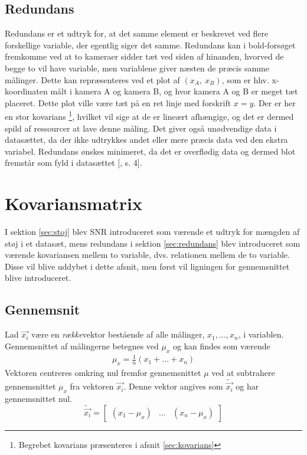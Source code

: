 \subsection{Redundans} \label{sec:redundans}
Redundans er et udtryk for, at det samme element er beskrevet ved flere forskellige variable, der egentlig siger det samme. Redundans kan i bold-forsøget fremkomme ved at to kameraer sidder tæt ved siden af hinanden, hvorved de begge to vil have variable, men variablene giver næsten de præcis samme målinger. Dette kan repræsenteres ved et plot af $(x_{A},\ x_{B})$, som er hhv. x-koordinaten målt i kamera A og kamera B, og hvor kamera A og B er meget tæt placeret. Dette plot ville være tæt på en ret linje med forskrift $x=y$. Der er her en stor kovarians \footnote{Begrebet kovarians præsenteres i afsnit \vref{sec:kovarians}}, hvilket vil sige at de er lineært afhængige, og det er dermed spild af ressourcer at lave denne måling. Det giver også unødvendige data i datasættet, da der ikke udtrykkes andet eller mere præcis data ved den ekstra variabel. Redundans ønskes minimeret, da det er overflødig data og dermed blot fremstår som fyld i datasættet [\citet{PCA_slens}, s. 4]. 

\section{Kovariansmatrix}\label{sec:kovarians}
I sektion \vref{sec:stoj} blev SNR introduceret som værende et udtryk for mængden af støj i et datasæt, mens redundans i sektion \vref{sec:redundans} blev introduceret som værende kovariansen mellem to variable, dvs. relationen mellem de to variable. Disse vil blive uddybet i dette afsnit, men først vil ligningen for gennemsnittet blive introduceret.

\subsection{Gennemsnit}
Lad $\vec{x_i}$ være en \emph{række}vektor bestående af alle målinger, $x_1,\ldots,x_n$, i variablen. Gennemsnittet af målingerne betegnes ved $\mu_{x}$ og kan findes som værende\\
\begin{align}
\mu_{x} = \frac{1}{n}(x_1+ ... + x_n)
\label{eq:average}
\end{align}
Vektoren centreres omkring nul fremfor gennemsnittet $\mu$ ved at subtrahere gennemsnittet $\mu_{x}$ fra vektoren $\vec{x_i}$. Denne vektor angives som $\tilde{\vec{x_i}}$ og har gennemsnittet nul.
\begin{equation}
\tilde{\vec{x_i}} = \begin{bmatrix}
(x_1 - \mu_{x}) & \hdots & (x_n - \mu_{x})
\end{bmatrix}
\end{equation}


